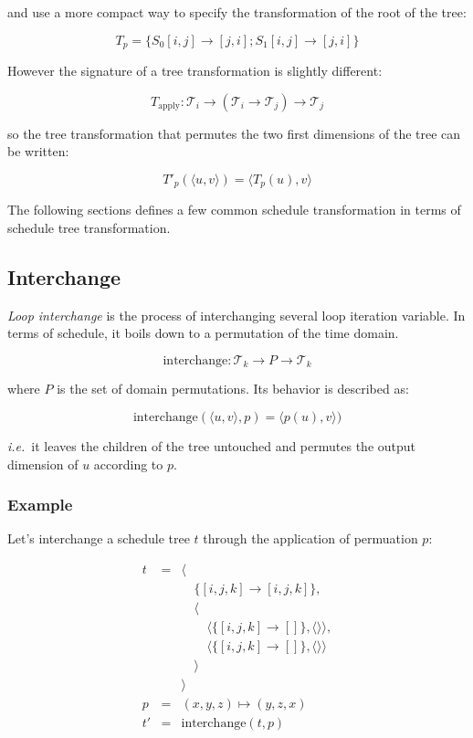 \documentclass{article}
\begin{document}
\noindent and use a more compact way to specify the transformation of the root of the tree:

\[
    T_p = \{ S_0[i,j] \rightarrow [j,i] ; S_1[i,j] \rightarrow [j,i] \}
\]

However the signature of a tree transformation is slightly different:

\[
    T_\mathrm{apply}: \mathcal{T}_i \rightarrow ( \mathcal{T}_i \rightarrow \mathcal{T}_j) \rightarrow \mathcal{T}_j
\]


\noindent so the tree transformation that permutes the two first dimensions of the tree can be written:

\[
    T'_p(\langle u, v \rangle) = \langle T_p(u), v \rangle
\]


The following sections defines a few common schedule transformation in terms of schedule tree transformation.

\subsection{Interchange}

\emph{Loop interchange} is the process of interchanging several loop iteration
variable. In terms of schedule, it boils down to a permutation of the time
domain.

\[
    \mathrm{interchange}: \mathcal{T}_k \rightarrow P \rightarrow \mathcal{T}_k
\]

\noindent where $P$ is the set of domain permutations. Its behavior is described as:

\[
    \mathrm{interchange}(\langle u, v\rangle, p) = \langle p(u), v\rangle)
\]

\noindent \emph{i.e.}\ it leaves the children of the tree untouched and
permutes the output dimension of $u$ according to $p$.

\subsubsection*{Example}

Let's interchange a schedule tree $t$ through the application of permuation $p$:

\[
    \begin{array}{lcl}
        t &=& \langle \\
          & & \quad\{[i,j,k] \rightarrow [i,j,k] \},\\
          & & \quad\langle \\
          & & \quad\quad \langle\{ [i,j,k] \rightarrow [] \}, \langle\rangle\rangle,\\
          & & \quad\quad \langle\{ [i,j,k] \rightarrow [] \}, \langle\rangle\rangle\\
          & & \quad\rangle \\
          & & \rangle \\
        p &=& (x, y, z) \mapsto (y, z, x) \\
        t'&=& \mathrm{interchange}(t, p) \\
    \end{array}
\]
\end{document}
